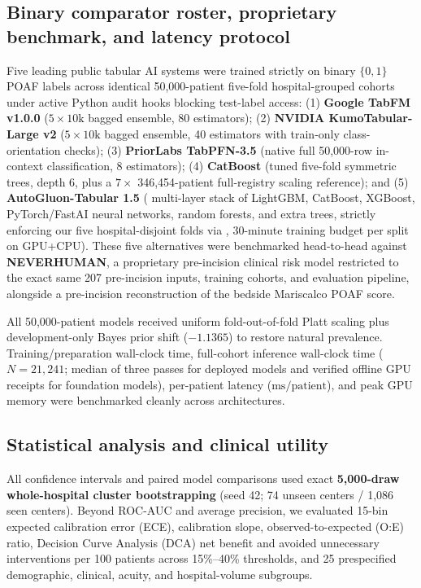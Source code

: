 \subsection{Binary comparator roster, proprietary benchmark, and latency protocol}
Five leading public tabular AI systems were trained strictly on binary $\{0,1\}$ POAF labels across identical 50,000-patient five-fold hospital-grouped cohorts under active Python audit hooks blocking test-label access: (1) \textbf{Google TabFM v1.0.0}\cite{kong2026tabfm} ($5\times 10\text{k}$ bagged ensemble, 80 estimators); (2) \textbf{NVIDIA KumoTabular-Large v2}\cite{qu2026kumotabular} ($5\times 10\text{k}$ bagged ensemble, 40 estimators with train-only class-orientation checks); (3) \textbf{PriorLabs TabPFN-3.5}\cite{hollmann2025tabpfn,jaeger2026tabpfn35} (native full 50,000-row in-context classification, 8 estimators); (4) \textbf{CatBoost}\cite{prokhorenkova2018catboost} (tuned five-fold symmetric trees, depth 6, plus a $7\times$ 346,454-patient full-registry scaling reference); and (5) \textbf{AutoGluon-Tabular 1.5}\cite{erickson2020autogluon} ( multi-layer stack of LightGBM, CatBoost, XGBoost, PyTorch/FastAI neural networks, random forests, and extra trees, strictly enforcing our five hospital-disjoint folds via , 30-minute training budget per split on GPU+CPU). These five alternatives were benchmarked head-to-head against \textbf{NEVERHUMAN}, a proprietary pre-incision clinical risk model restricted to the exact same 207 pre-incision inputs, training cohorts, and evaluation pipeline, alongside a pre-incision reconstruction of the bedside Mariscalco POAF score.\cite{mariscalco2014poaf}

All 50,000-patient models received uniform fold-out-of-fold Platt scaling\cite{platt1999probabilistic} plus development-only Bayes prior shift ($-1.1365$) to restore natural prevalence.\cite{king2001logistic,saerens2002adjusting} Training/preparation wall-clock time, full-cohort inference wall-clock time ($N{=}21{,}241$; median of three passes for deployed models and verified offline GPU receipts for foundation models), per-patient latency ($\mathrm{ms/patient}$), and peak GPU memory were benchmarked cleanly across architectures.

\subsection{Statistical analysis and clinical utility}
All confidence intervals and paired model comparisons used exact \textbf{5,000-draw whole-hospital cluster bootstrapping} (seed 42; 74 unseen centers / 1,086 seen centers).\cite{davison1997bootstrap,obuchowski1997clustered} Beyond ROC-AUC and average precision, we evaluated 15-bin expected calibration error (ECE), calibration slope, observed-to-expected (O:E) ratio,\cite{vancalster2019calibration,austin2019ici} Decision Curve Analysis (DCA) net benefit and avoided unnecessary interventions per 100 patients across 15\%--40\% thresholds,\cite{vickers2006decision} and 25 prespecified demographic, clinical, acuity, and hospital-volume subgroups.
